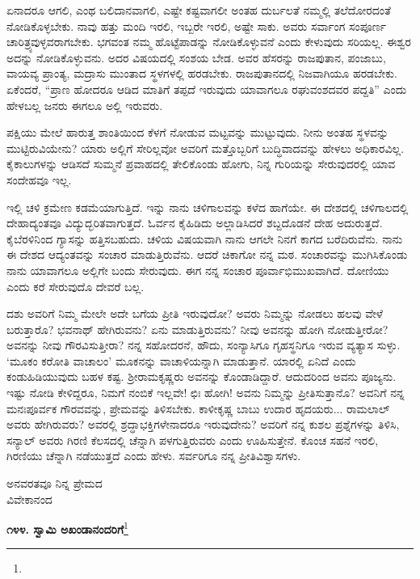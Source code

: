 ಏನಾದರೂ ಆಗಲಿ, ಎಂಥ ಬಲಿದಾನವಾಗಲಿ, ಎಷ್ಟೇ ಕಷ್ಟವಾಗಲೀ ಅಂತಹ ದುರ್ಬ\break ಲತೆ ನಮ್ಮಲ್ಲಿ ತಲೆದೋರದಂತೆ ನೋಡಿಕೊಳ್ಳಬೇಕು. ನಾವು ಹತ್ತು ಮಂದಿ ಇರಲಿ, ಇಬ್ಬರೇ ಇರಲಿ, ಅಷ್ಟೇ ಸಾಕು. ಅವರು ಸರ್ವಾಂಗ ಸಂಪೂರ್ಣ ಚಾರಿತ್ರ್ಯವುಳ್ಳವರಾಗಬೇಕು. ಭಗವಂತ ನಮ್ಮ ಹೊಟ್ಟೆಪಾಡನ್ನು ನೋಡಿಕೊಳ್ಳುವನೆ ಎಂದು ಕೇಳುವುದು ಸರಿಯಲ್ಲ. ಈಶ್ವರ ಅದನ್ನು ನೋಡಿಕೊಳ್ಳುವನು. ಅದರ ವಿಷಯದಲ್ಲಿ ಸಂಶಯ ಬೇಡ. ಅವರ ಹೆಸರನ್ನು ರಾಜಪುತಾನ, ಪಂಜಾಬು, ವಾಯವ್ಯ ಪ್ರಾಂತ್ಯ, ಮದ್ರಾಸು ಮುಂತಾದ ಸ್ಥಳಗಳಲ್ಲಿ ಹರಡಬೇಕು. ರಾಜಪುತಾನದಲ್ಲಿ ನಿಜವಾಗಿಯೂ ಹರಡಬೇಕು. ಏಕೆಂದರೆ, “ಪ್ರಾಣ ಹೋದರೂ ಆಡಿದ ಮಾತಿಗೆ ತಪ್ಪದೆ ಇರುವುದು ಯಾವಾಗಲೂ ರಘುವಂಶದವರ ಪದ್ದತಿ” ಎಂದು ಹೇಳಬಲ್ಲ ಜನರು ಈಗಲೂ ಅಲ್ಲಿ ಇರುವರು.

ಪಕ್ಷಿಯು ಮೇಲೆ ಹಾರುತ್ತ ಶಾಂತಿಯಿಂದ ಕೆಳಗೆ ನೋಡುವ ಮಟ್ಟವನ್ನು ಮುಟ್ಟುವುದು. ನೀನು ಅಂತಹ ಸ್ಥಳವನ್ನು ಮುಟ್ಟಿರುವಿಯೇನು? ಯಾರು ಅಲ್ಲಿಗೆ ಸೇರಿಲ್ಲವೋ ಅವರಿಗೆ ಮತ್ತೊಬ್ಬರಿಗೆ ಬುದ್ಧಿವಾದವನ್ನು ಹೇಳಲು ಅಧಿಕಾರವಿಲ್ಲ. ಕೈಕಾಲುಗಳನ್ನು ಆಡಿಸದೆ ಸುಮ್ಮನೆ ಪ್ರವಾಹದಲ್ಲಿ ತೇಲಿಕೊಂಡು ಹೋಗು, ನಿನ್ನ ಗುರಿಯನ್ನು ಸೇರುವುದರಲ್ಲಿ ಯಾವ ಸಂದೇಹವೂ ಇಲ್ಲ.

ಇಲ್ಲಿ ಚಳಿ ಕ್ರಮೇಣ ಕಡಮೆಯಾಗುತ್ತಿದೆ. ಇನ್ನು ನಾನು ಚಳಿಗಾಲವನ್ನು ಕಳೆದ ಹಾಗೆಯೇ. ಈ ದೇಶದಲ್ಲಿ ಚಳಿಗಾಲದಲ್ಲಿ ದೇಹಾದ್ಯಂತವೂ ವಿದ್ಯುದ್ಭರಿತವಾಗುತ್ತದೆ. ಓರ್ವನ ಕೈಹಿಡಿದು ಅಲ್ಲಾಡಿಸಿದರೆ ಶಬ್ದದೊಡನೆ ದೇಹ ಅದುರುತ್ತದೆ. ಕೈಬೆರಳಿನಿಂದ ಗ್ಯಾಸನ್ನು ಹತ್ತಿಸಬಹುದು. ಚಳಿಯ ವಿಷಯವಾಗಿ ನಾನು ಆಗಲೇ ನಿನಗೆ ಕಾಗದ ಬರೆದಿರುವೆನು. ನಾನು ಈ ದೇಶದ ಆದ್ಯಂತವನ್ನು ಸಂಚಾರ ಮಾಡುತ್ತಿರುವೆನು. ಆದರೆ ಚಿಕಾಗೋ ನನ್ನ ಮಠ. ಸಂಚಾರವನ್ನು ಮುಗಿಸಿಕೊಂಡು ನಾನು ಯಾವಾಗಲೂ ಅಲ್ಲಿಗೇ ಬಂದು ಸೇರುವುದು. ಈಗ ನನ್ನ ಸಂಚಾರ ಪೂರ್ವಾಭಿಮುಖವಾಗಿದೆ. ದೋಣಿಯು ಎಂದು ಕರೆ ಸೇರುವುದೊ ದೇವರೆ ಬಲ್ಲ.

ದಶು ಅವರಿಗೆ ನಿಮ್ಮ ಮೇಲೇ ಅದೇ ಬಗೆಯ ಪ್ರೀತಿ ಇರುವುದೋ? ಅವರು ನಿಮ್ಮನ್ನು ನೋಡಲು ಹಲವು ವೇಳೆ ಬರುತ್ತಾರೊ? ಭವನಾಥ್ ಹೇಗಿರುವನು? ಏನು ಮಾಡುತ್ತಿರುವನು? ನೀವು ಅವನನ್ನು ಹೋಗಿ ನೋಡುತ್ತೀರೋ? ಅವನನ್ನು ನೀವು ಗೌರವಿಸುತ್ತೀರಾ? ನನ್ನ ಸಹೋದರನೆ, ಹೌದು, ಸಂನ್ಯಾಸಿಗೂ ಗೃಹಸ್ಥನಿಗೂ ಇರುವ ವ್ಯತ್ಯಾಸ ಸುಳ್ಳು. ‘ಮೂಕಂ ಕರೋತಿ ವಾಚಾಲಂ’ ಮೂಕನನ್ನು ವಾಚಾಳಿಯನ್ನಾಗಿ ಮಾಡುತ್ತಾನೆ. ಯಾರಲ್ಲಿ ಏನಿದೆ ಎಂದು ಕಂಡುಹಿಡಿಯುವುದು ಬಹಳ ಕಷ್ಟ. ಶ‍್ರೀರಾಮಕೃಷ್ಣರು ಅವನನ್ನು ಕೊಂಡಾಡಿದ್ದಾರೆ. ಆದುದರಿಂದ ಅವನು ಪೂಜ್ಯನು. ಇಷ್ಟು ನೋಡಿ ಕೇಳಿದ್ದರೂ, ನಿಮಗೆ ನಂಬಿಕೆ ಇಲ್ಲವೇ! ಛಿಃ ಹೋಗಿ! ಅವನು ನಿಮ್ಮನ್ನು ಪ್ರೀತಿಸುತ್ತಾನೊ? ಅವನಿಗೆ ನನ್ನ ಮನಃಪೂರ್ವಕ ಗೌರವವನ್ನು, ಪ್ರೇಮವನ್ನು ತಿಳಿಸಬೇಕು. ಕಾಳೀಕೃಷ್ಣ ಬಾಬು ಉದಾರ ಹೃದಯರು... ರಾಮಲಾಲ್ ಅವರು ಹೇಗಿರುವರು? ಅವರಲ್ಲಿ ಶ್ರದ್ಧಾಭಕ್ತಿಗಳೇನಾದರೂ ಇರುವುದೇನು? ಅವರಿಗೆ ನನ್ನ ಕುಶಲ ಪ್ರಶ್ನೆಗಳನ್ನು ತಿಳಿಸಿ, ಸನ್ಯಾಲ್ ಅವರು ಗಿರಣಿ ಕೆಲಸದಲ್ಲಿ ಚೆನ್ನಾಗಿ ಪಳಗುತ್ತಿರುವರು ಎಂದು ಊಹಿಸುತ್ತೇನೆ. ಕೊಂಚ ಸಹನೆ ಇರಲಿ, ಗಿರಣಿಯು ಚೆನ್ನಾಗಿ ನಡೆಯುತ್ತದೆ ಎಂದು ಹೇಳು. ಸರ್ವರಿಗೂ ನನ್ನ ಪ್ರೀತಿವಿಶ್ವಾಸಗಳು.

{\flushright
ಅನವರತವೂ ನಿನ್ನ ಪ್ರೇಮದ\\ವಿವೇಕಾನಂದ\par}

\begin{center}
\textbf{೧೪೪. ಸ್ವಾಮಿ ಅಖಂಡಾನಂದರಿಗೆ}\footnote{}
\end{center}

